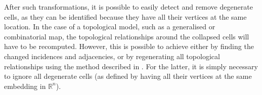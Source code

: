 
After such transformations, it is possible to easily detect and remove degenerate cells, as they can be identified because they have all their vertices at the same location.
In the case of a topological model, such as a generalised or combinatorial map, the topological relationships around the collapsed cells will have to be recomputed.
However, this is possible to achieve either by finding the changed incidences and adjacencies, or by regenerating all topological relationships using the method described in .
For the latter, it is simply necessary to ignore all degenerate cells (as defined by having all their vertices at the same embedding in $\mathbb{R}^n$).

